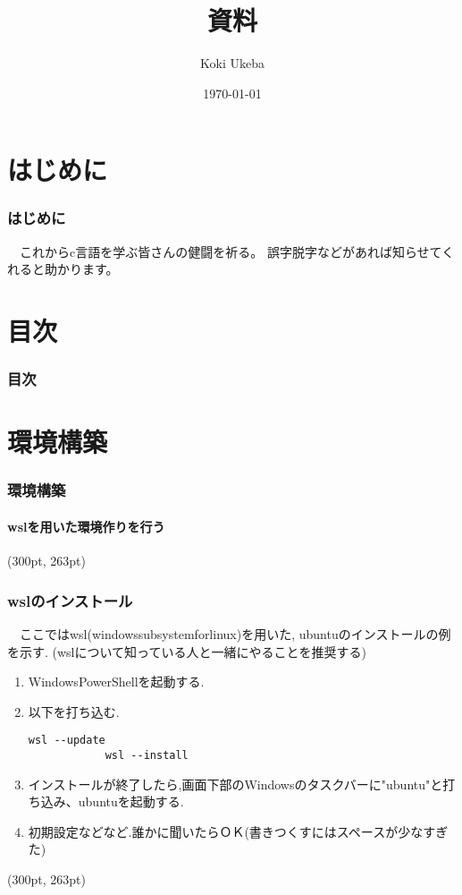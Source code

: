 \documentclass[dvipdfmx]{beamer}
\title{資料}
\author{Koki Ukeba}
\date{\today}
\begin{document}
\begin{frame}[plain, label=1]
    \frametitle{}
    \titlepage
\end{frame}

\section{はじめに}
\begin{frame}[c, label=2]
    \frametitle{はじめに}
    　これからc言語を学ぶ皆さんの健闘を祈る。
    誤字脱字などがあれば知らせてくれると助かります。
\end{frame}

\section{目次}
\begin{frame}[allowframebreaks, label=3]
    \frametitle{目次}
    \tableofcontents
\end{frame}

\section{環境構築}
\begin{frame}[label=4]
    \frametitle{環境構築}
    \framesubtitle{wslを用いた環境作りを行う}
    \tableofcontents[sections={2,3}]
    \begin{textblock*}{0.3\linewidth}(300pt, 263pt)
        \hyperlink{3}{}
        \space
        \hyperlink{5}{}
    \end{textblock*}
\end{frame}

\begin{frame}[t, fragile, label=5]
    \frametitle{wslのインストール}
    　ここではwsl(windows\space subsystem\space for\space linux)を用いた,
    ubuntuのインストールの例を示す.
    (wslについて知っている人と一緒にやることを推奨する)
    \begin{enumerate}
        \item Windows\space PowerShellを起動する.
        \item 以下を打ち込む.
        \begin{lstlisting}[gobble=9, caption=Windows\space PowerShell]
            wsl --update
            wsl --install
        \end{lstlisting}
        \item インストールが終了したら,画面下部のWindowsのタスクバーに"ubuntu"と打ち込み、ubuntuを起動する.
        \item 初期設定などなど.誰かに聞いたらＯＫ(書きつくすにはスペースが少なすぎた)
    \end{enumerate}
    \begin{textblock*}{0.3\linewidth}(300pt, 263pt)
        \hyperlink{4}{}
        \space
        \hyperlink{6}{}
    \end{textblock*}
\end{frame}
\end{document}

